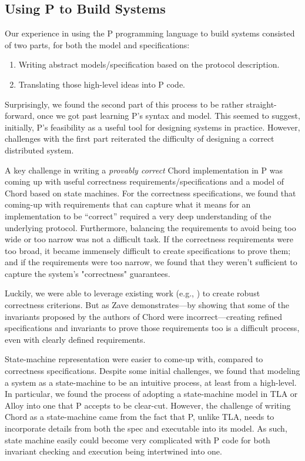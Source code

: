 \documentclass[conference]{IEEEtran}
\begin{document}
\subsection{Using P to Build Systems}
Our experience in using the P programming language to build systems consisted of two parts, for both the model and specifications:
\begin{enumerate}
    \item Writing abstract models/specification based on the protocol description.
    \item Translating those high-level ideas into P code.
\end{enumerate}
Surprisingly, we found the second part of this process to be rather straight-forward, once we got past learning P's syntax and model. This seemed to suggest, initially, P's feasibility as a useful tool for designing systems in practice. However, challenges with the first part reiterated the difficulty of designing a correct distributed system.

A key challenge in writing a \textit{provably correct} Chord implementation in P was coming up with useful correctness requirements/specifications and a model of Chord based on state machines. For the correctness specifications, we found that coming-up with requirements that can capture what it means for an implementation to be ``correct'' required a very deep understanding of the underlying protocol. Furthermore, balancing the requirements to avoid being too wide or too narrow was not a difficult task. If the correctness requirements were too broad, it became immensely difficult to create specifications to prove them; and if the requirements were too narrow, we found that they weren't sufficient to capture the system's "correctness" guarantees.

Luckily, we were able to leverage existing work (e.g., \cite{lund_verification_2019,zave_using_2012}) to create robust correctness criterions. But as Zave demonstrates—by showing that some of the invariants proposed by the authors of Chord were incorrect—creating refined specifications and invariants to prove those requirements too is a difficult process, even with clearly defined requirements.

State-machine representation were easier to come-up with, compared to correctness specifications. Despite some initial challenges,  we found that modeling a system as a state-machine to be an intuitive process, at least from a high-level. In particular, we found the process of adopting a state-machine model in TLA or Alloy into one that P accepts to be clear-cut. However, the challenge of writing Chord as a state-machine came from the fact that P, unlike TLA, needs to incorporate details from both the spec and executable into its model. As such, state machine easily could become very complicated with P code for both invariant checking and execution being intertwined into one.
\end{document}
